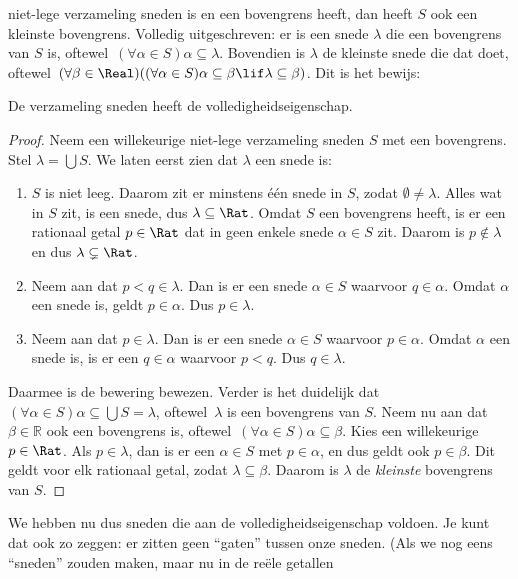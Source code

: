 \documentclass[../../../include/open-logic-section]{subfiles}
\begin{document}
niet-lege verzameling sneden is
en een bovengrens heeft, dan heeft $S$ ook een kleinste bovengrens.
Volledig uitgeschreven: er is een snede $\lambda$ die een bovengrens
van $S$ is, oftewel\ $(\forall \alpha \in S)\alpha \subseteq
\lambda$. Bovendien is $\lambda$ de kleinste snede die dat doet,
oftewel\ $(\forall \beta \in \Real)((\forall \alpha \in S)\alpha \subseteq \beta \lif \lambda \subseteq \beta)$. Dit
is het bewijs:
\begin{thm}
De verzameling sneden heeft de volledigheidseigenschap.
\end{thm}
\begin{proof}
Neem een willekeurige niet-lege verzameling sneden $S$ met een
bovengrens. Stel $\lambda = \bigcup S$.
We laten eerst zien dat $\lambda$ een snede is:
\begin{enumerate}
\item $S$ is niet leeg. Daarom zit er minstens één snede in
$S$, zodat $\emptyset \neq \lambda$. Alles wat in $S$ zit, is een snede,
dus $\lambda \subseteq \Rat$. Omdat $S$ een bovengrens heeft, is er
een rationaal getal $p \in \Rat$ dat in geen enkele snede $\alpha \in S$
zit. Daarom
is $p\notin \lambda$ en dus $\lambda \subsetneq \Rat$.
\item Neem aan dat $p < q \in \lambda$. Dan is er een snede $\alpha \in S$
waarvoor $q \in \alpha$. Omdat $\alpha$ een snede is, geldt
$p \in \alpha$. Dus $p \in \lambda$.
\item Neem aan dat $p \in \lambda$. Dan is er een snede $\alpha \in S$
waarvoor $p \in \alpha$. Omdat $\alpha$ een snede is, is er een
$q \in \alpha$ waarvoor $p < q$. Dus $q \in \lambda$.
\end{enumerate}
Daarmee is de bewering bewezen. Verder is het duidelijk dat $(\forall \alpha \in S)\alpha
\subseteq \bigcup S = \lambda$, oftewel\ $\lambda$ is een bovengrens van $S$. Neem nu aan dat $\beta \in \mathbb{R}$ ook een bovengrens is, oftewel\ $(\forall \alpha \in S)\alpha \subseteq \beta$. Kies een willekeurige $p \in \Rat$. Als $p \in \lambda$, dan is er een $\alpha \in S$ met $p \in \alpha$, en dus geldt ook $p \in \beta$. Dit geldt voor elk rationaal getal, zodat $\lambda \subseteq \beta$. Daarom is $\lambda$ de \emph{kleinste} bovengrens van $S$.
\end{proof}
We hebben nu dus sneden die aan de volledigheidseigenschap voldoen.
Je kunt dat ook zo zeggen: er zitten geen “gaten” tussen onze sneden.
(Als we nog eens “sneden” zouden maken, maar nu in de reële getallen
\end{document}
